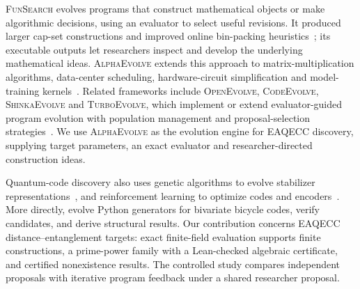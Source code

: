 \textsc{FunSearch} evolves programs that construct mathematical objects or
make algorithmic decisions, using an evaluator to select useful revisions.
It produced larger cap-set constructions and improved online bin-packing
heuristics~\citep{FunSearch}; its executable outputs let researchers inspect
and develop the underlying mathematical ideas. \textsc{AlphaEvolve}
extends this approach to matrix-multiplication algorithms, data-center
scheduling, hardware-circuit simplification and model-training
kernels~\citep{AlphaEvolve,Georgiev2025}. Related frameworks include
\textsc{OpenEvolve}, \textsc{CodeEvolve}, \textsc{ShinkaEvolve} and
\textsc{TurboEvolve}, which implement or extend evaluator-guided program
evolution with population management and proposal-selection
strategies~\citep{OpenEvolve,CodeEvolve,ShinkaEvolve,TurboEvolve}.
We use \textsc{AlphaEvolve} as the evolution engine for EAQECC discovery,
supplying target parameters, an exact evaluator and researcher-directed
construction ideas.

Quantum-code discovery also uses genetic algorithms to evolve stabilizer
representations~\citep{WebsterBrowne2024}, and reinforcement learning to
optimize codes and encoders~\citep{Nautrup2019,Su2023,Mauron2023,Olle2024}.
More directly, \citet{CruzBenito2026} evolve Python generators for
bivariate bicycle codes, verify candidates, and derive structural results.
Our contribution concerns EAQECC distance--entanglement targets: exact
finite-field evaluation supports finite constructions, a prime-power
family with a Lean-checked algebraic certificate, and certified
nonexistence results. The controlled study compares independent proposals
with iterative program feedback under a shared researcher proposal.

